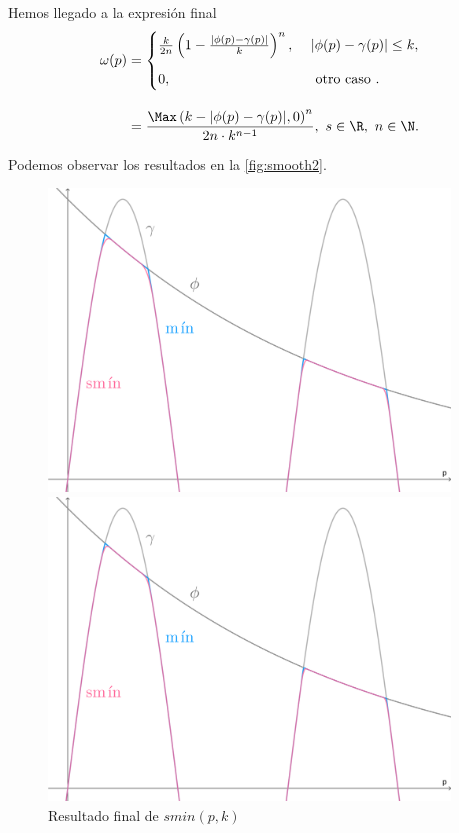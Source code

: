 Hemos llegado a la expresión final
\begin{align*}
    \omega(p) &= \begin{cases}
        \frac{k}{2n}\left( 1-\frac{|\phi(p)-\gamma(p)|}{k} \right)^n,\ &|\phi(p)-\gamma(p)|\le k,\\[10pt]
        0,\ &\text{ otro caso }.
    \end{cases}\\[10pt] &= \frac{\Max\left( k - |\phi(p) - \gamma(p)|, 0\right)^n}{2n\cdot k^{n-1}}  ,\ s\in\R,\ n\in\N.
\end{align*}

Podemos observar los resultados en la \autoref{fig:smooth2}.
\begin{figure}[!h]
     \begin{minipage}[c]{0.49\linewidth}
        \centering
        \includegraphics[width=0.95\textwidth]{Plantilla-TFG-master/img/smin_3.png}
        \caption{$k=0.1,\ n=2$}
     \end{minipage}
     \begin{minipage}[c]{0.49\linewidth}
        \centering
        \includegraphics[width=0.95\textwidth]{Plantilla-TFG-master/img/smin_4.png}
        \caption{$k=0.1,\ n=3$}
     \end{minipage}
     \caption{Resultado final de $smin(p,k)$ }
     \label{fig:smooth2}
\end{figure}

